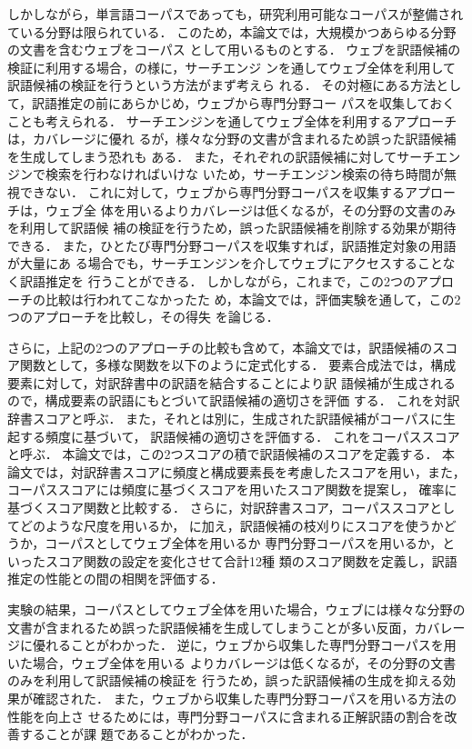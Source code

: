 \documentclass[japanese]{jnlp_1.3a}
\begin{document}
しかしながら，単言語コーパスであっても，研究利用可能なコーパスが整備され
ている分野は限られている．
このため，本論文では，大規模かつあらゆる分野の文書を含むウェブをコーパス
として用いるものとする．
ウェブを訳語候補の検証に利用する場合，\cite{Cao02as}の様に，サーチエンジ
ンを通してウェブ全体を利用して訳語候補の検証を行うという方法がまず考えら
れる．
その対極にある方法として，訳語推定の前にあらかじめ，ウェブから専門分野コー
パスを収集しておくことも考えられる．
サーチエンジンを通してウェブ全体を利用するアプローチは，カバレージに優れ
るが，様々な分野の文書が含まれるため誤った訳語候補を生成してしまう恐れも
ある．
また，それぞれの訳語候補に対してサーチエンジンで検索を行わなければいけな
いため，サーチエンジン検索の待ち時間が無視できない．
これに対して，ウェブから専門分野コーパスを収集するアプローチは，ウェブ全
体を用いるよりカバレージは低くなるが，その分野の文書のみを利用して訳語候
補の検証を行うため，誤った訳語候補を削除する効果が期待できる．
また，ひとたび専門分野コーパスを収集すれば，訳語推定対象の用語が大量にあ
る場合でも，サーチエンジンを介してウェブにアクセスすることなく訳語推定を
行うことができる．
しかしながら，これまで，この2つのアプローチの比較は行われてこなかったた
め，本論文では，評価実験を通して，この2つのアプローチを比較し，その得失
を論じる．

さらに，上記の2つのアプローチの比較も含めて，本論文では，訳語候補のスコ
ア関数として，多様な関数を以下のように定式化する．
要素合成法では，構成要素に対して，対訳辞書中の訳語を結合することにより訳
語候補が生成されるので，構成要素の訳語にもとづいて訳語候補の適切さを評価
する．
これを対訳辞書スコアと呼ぶ．
また，それとは別に，生成された訳語候補がコーパスに生起する頻度に基づいて，
訳語候補の適切さを評価する．
これをコーパススコアと呼ぶ．
本論文では，この2つスコアの積で訳語候補のスコアを定義する．
本論文では，対訳辞書スコアに頻度と構成要素長を考慮したスコアを用い，また，
コーパススコアには頻度に基づくスコアを用いたスコア関数を提案し，
確率に基づくスコア関数\cite{Fujii00}と比較する．
さらに，対訳辞書スコア，コーパススコアとしてどのような尺度を用いるか，
に加え，訳語候補の枝刈りにスコアを使うかどうか，コーパスとしてウェブ全体を用いるか
専門分野コーパスを用いるか，といったスコア関数の設定を変化させて合計12種
類のスコア関数を定義し，訳語推定の性能との間の相関を評価する．

実験の結果，コーパスとしてウェブ全体を用いた場合，ウェブには様々な分野の
文書が含まれるため誤った訳語候補を生成してしまうことが多い反面，カバレー
ジに優れることがわかった．
逆に，ウェブから収集した専門分野コーパスを用いた場合，ウェブ全体を用いる
よりカバレージは低くなるが，その分野の文書のみを利用して訳語候補の検証を
行うため，誤った訳語候補の生成を抑える効果が確認された．
また，ウェブから収集した専門分野コーパスを用いる方法の性能を向上さ
せるためには，専門分野コーパスに含まれる正解訳語の割合を改善することが課
題であることがわかった．
\end{document}
